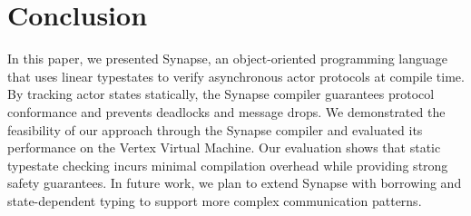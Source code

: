 \section{Conclusion}
In this paper, we presented Synapse, an object-oriented programming language that uses linear typestates to verify asynchronous actor protocols at compile time. By tracking actor states statically, the Synapse compiler guarantees protocol conformance and prevents deadlocks and message drops. We demonstrated the feasibility of our approach through the Synapse compiler and evaluated its performance on the Vertex Virtual Machine. Our evaluation shows that static typestate checking incurs minimal compilation overhead while providing strong safety guarantees. In future work, we plan to extend Synapse with borrowing and state-dependent typing to support more complex communication patterns.
